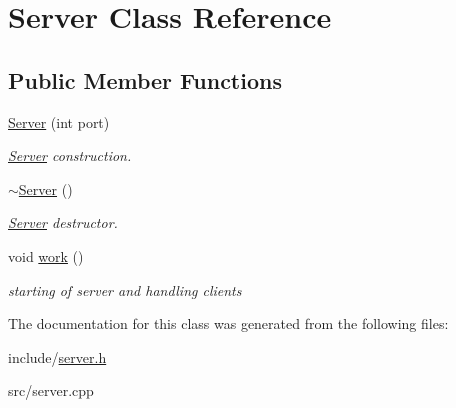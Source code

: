 \hypertarget{classServer}{}\section{Server Class Reference}
\label{classServer}
\subsection*{Public Member Functions}
\begin{DoxyCompactItemize}
\item 
\mbox{\label{classServer_a7d1fe6ba5f0fe9190a4f039662ea0e85}} 
\hyperlink{classServer_a7d1fe6ba5f0fe9190a4f039662ea0e85}{Server} (int port)
\begin{DoxyCompactList}\small\item\em \hyperlink{classServer}{Server} construction. \end{DoxyCompactList}\item 
\mbox{\label{classServer_a4b3aa2579cb1c8cd1d069582c14d0fa6}} 
\hyperlink{classServer_a4b3aa2579cb1c8cd1d069582c14d0fa6}{$\sim$\+Server} ()
\begin{DoxyCompactList}\small\item\em \hyperlink{classServer}{Server} destructor. \end{DoxyCompactList}\item 
\mbox{\label{classServer_a0e4dd73ec8cef85f5145e286cf9cd3dc}} 
void \hyperlink{classServer_a0e4dd73ec8cef85f5145e286cf9cd3dc}{work} ()
\begin{DoxyCompactList}\small\item\em starting of server and handling clients \end{DoxyCompactList}\end{DoxyCompactItemize}


The documentation for this class was generated from the following files\+:\begin{DoxyCompactItemize}
\item 
include/\hyperlink{server_8h}{server.\+h}\item 
src/server.\+cpp\end{DoxyCompactItemize}
